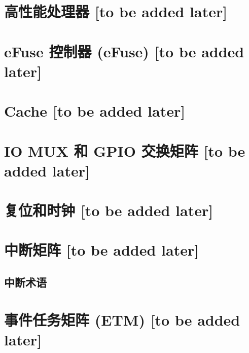 \documentclass{article}
\begin{document}







\section{高性能处理器 [to be added later]}\label{mod:riscvcpu}
\section{eFuse 控制器 (eFuse) [to be added later]}\label{mod:efuse}
\section{Cache [to be added later]}\label{mod:cache}
\section{IO MUX 和 GPIO 交换矩阵 [to be added later]}\label{mod:iomuxgpio}
\section{复位和时钟 [to be added later]}\label{mod:resclk}
\section{中断矩阵 [to be added later]}\label{mod:intmtrx}
        \subsection{中断术语}\label{sec:intmtx-int-terminology}

\section{事件任务矩阵 (ETM) [to be added later]}\label{mod:evntaskmatrix}
\end{document}
